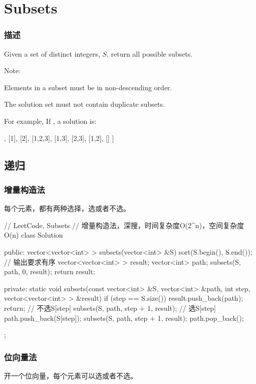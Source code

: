 \section{Subsets} %
\label{sec:subsets}


\subsubsection{描述}
Given a set of distinct integers, $S$, return all possible subsets.

Note:
\begindot
\item Elements in a subset must be in non-descending order.
\item The solution set must not contain duplicate subsets.
\myenddot

For example, If , a solution is:
\begin{Code}
	[
	[3],
	[1],
	[2],
	[1,2,3],
	[1,3],
	[2,3],
	[1,2],
	[]
	]
\end{Code}


\subsection{递归}


\subsubsection{增量构造法}
每个元素，都有两种选择，选或者不选。

\begin{Code}
	// LeetCode, Subsets
	// 增量构造法，深搜，时间复杂度O(2^n)，空间复杂度O(n)
	class Solution {
		public:
		vector<vector<int> > subsets(vector<int> &S) {
			sort(S.begin(), S.end());  // 输出要求有序
			vector<vector<int> > result;
			vector<int> path;
			subsets(S, path, 0, result);
			return result;
		}
		
		private:
		static void subsets(const vector<int> &S, vector<int> &path, int step,
		vector<vector<int> > &result) {
			if (step == S.size()) {
				result.push_back(path);
				return;
			}
			// 不选S[step]
			subsets(S, path, step + 1, result);
			// 选S[step]
			path.push_back(S[step]);
			subsets(S, path, step + 1, result);
			path.pop_back();
		}
	};
\end{Code}


\subsubsection{位向量法}
开一个位向量，每个元素可以选或者不选。

